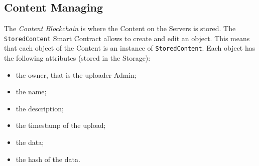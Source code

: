 \documentclass[hidelinks,conference,compsoc]{IEEEtran}
\begin{document}
\subsection{Content Managing}
The \textit{Content Blockchain} is where the Content on the Servers is stored.
The \texttt{StoredContent} Smart Contract allows to create and edit an object. This means that each object of the Content is an instance of \texttt{StoredContent}. 
Each object has the following attributes (stored in the Storage): 
\begin{itemize}
	\item the owner, that is the uploader Admin;
	\item the name;
	\item the description;
	\item the timestamp of the upload;
	\item the data;
	\item the hash of the data.
\end{itemize}
\end{document}
